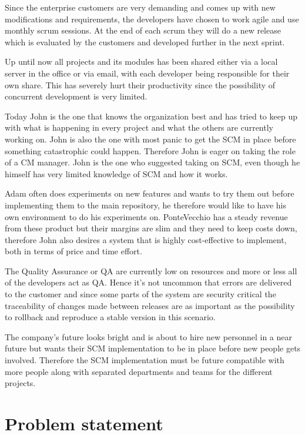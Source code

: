\documentclass[10pt]{article}
\begin{document}
\noindent Since the enterprise customers are very demanding and comes up with new modifications and requirements, the developers have chosen to work agile and use monthly scrum sessions. At the end of each scrum they will do a new release which is evaluated by the customers and developed further in the next sprint.

\noindent Up until now all projects and its modules has been shared either via a local server in the office or via email, with each developer being responsible for their own share. This has severely hurt their productivity since the possibility of concurrent development is very limited. 

\noindent Today John is the one that knows the organization best and has tried to keep up with what is happening in every project and what the others are currently working on. John is also the one with most panic to get the SCM in place before something catastrophic could happen. Therefore John is eager on taking the role of a CM manager. John is the one who suggested taking on SCM, even though he himself has very limited knowledge of SCM and how it works.

\noindent Adam often does experiments on new features and wants to try them out before implementing them to the main repository, he therefore would like to have his own environment to do his experiments on. PonteVecchio has a steady revenue from these product but their margins are slim and they need to keep costs down, therefore John also desires a system that is highly cost-effective to implement, both in terms of price and time effort. 

\noindent The Quality Assurance or QA are currently low on resources and more or less all of the developers act as QA. Hence it’s not uncommon that errors are delivered to the customer and since some parts of the system are security critical the traceability of changes made between releases are as important as the possibility to rollback and reproduce a stable version in this scenario.

\noindent The company's future looks bright and is about to hire new personnel in a near future but wants their SCM implementation to be in place before new people gets involved. Therefore the SCM implementation must be future compatible with more people along with separated departments and teams for the different projects.

\section{Problem statement}
\end{document}
